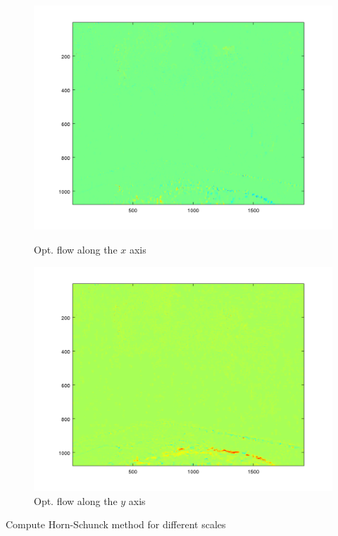 \documentclass[10pt,a4paper]{report}
\begin{document}
		\begin{figure}[h]
			\begin{minipage}[b]{.49\linewidth}
				\includegraphics[width=1.0\textwidth]{ofx.png}
				\caption{Opt. flow along the $x$ axis}
			\end{minipage}
			\hfill
			\begin{minipage}[b]{0.49\linewidth}
				\includegraphics[width=1.0\textwidth]{ofy.png}
				\caption{Opt. flow along the $y$ axis}
			\end{minipage}
			\label{fig:f}
		\end{figure}
		
		
			Compute Horn-Schunck method for different scales
			\newline
			
\end{document}
